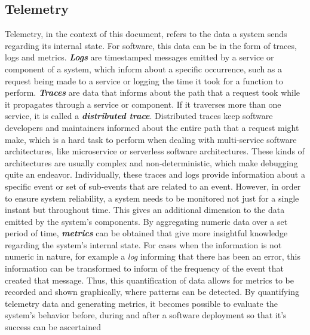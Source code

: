 \subsection{Telemetry}\label{state-of-the-art:ss:telemetry}

Telemetry, in the context of this document, refers to the data a system sends regarding its internal state. For software, this data can be in the form of traces, logs and metrics.
\textbf{\textit{Logs}} are timestamped messages emitted by a service or component of a system, which inform about a specific occurrence, such as a request being made to a service or logging the time it took for a function to perform.
\textbf{\textit{Traces}} are data that informs about the path that a request took while it propagates through a service or component. If it traverses more than one service, it is called a \textbf{\textit{distributed trace}}. Distributed traces keep software developers and maintainers informed about the entire path that a request might make, which is a hard task to perform when dealing with multi-service software architectures, like microservice or serverless software architectures. These kinds of architectures are usually complex and non-deterministic, which make debugging quite an endeavor. Individually, these traces and logs provide information about a specific event or set of sub-events that are related to an event. However, in order to ensure system reliability, a system needs to be monitored not just for a single instant but throughout time. This gives an additional dimension to the data emitted by the system's components. By aggregating numeric data over a set period of time, \textbf{\textit{metrics}} can be obtained that give more insightful knowledge regarding the system's internal state. For cases when the information is not numeric in nature, for example a \textit{log} informing that there has been an error, this information can be transformed to inform of the frequency of the event that created that message. Thus, this quantification of data allows for metrics to be recorded and shown graphically, where patterns can be detected. By quantifying telemetry data and generating metrics, it becomes possible to evaluate the system's behavior before, during and after a software deployment so that it's success can be ascertained~\Parencite{mills1988software}
